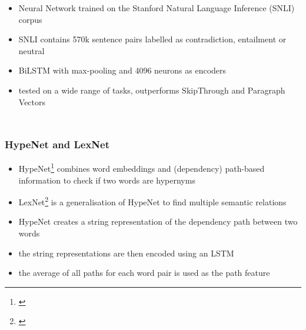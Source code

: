 \documentclass[11pt,aspectratio=169,usenames,dvipsnames]{beamer}
\begin{document}
    \begin{frame}[t]
        \begin{columns}
            \column{2.8in}
            \begin{itemize}
                \item<1-> Neural Network trained on the Stanford Natural Language Inference (SNLI) corpus
                \item<1-> SNLI contains 570k sentence pairs labelled as contradiction, entailment or neutral
                \item<2-> BiLSTM with max-pooling and 4096 neurons as encoders
                \item<2-> tested on a wide range of tasks, outperforms SkipThrough and Paragraph Vectors
            \end{itemize}
            \column{3in}
        \end{columns}
    \end{frame}

    \begin{frame}[t]
        \frametitle{HypeNet and LexNet}
        \begin{itemize}
            \item HypeNet\footnote{\cite{DBLP:conf/acl/ShwartzGD16}} combines word embeddings and (dependency) path-based information to check if two words are hypernyms
            \item LexNet\footnote{\cite{DBLP:journals/corr/ShwartzD16}} is a generalisation of HypeNet to find multiple semantic relations\pause
            \item HypeNet creates a string representation of the dependency path between two words
            \item the string representations are then encoded using an LSTM
            \item the average of all paths for each word pair is used as the path feature
        \end{itemize}
    \end{frame}
\end{document}
